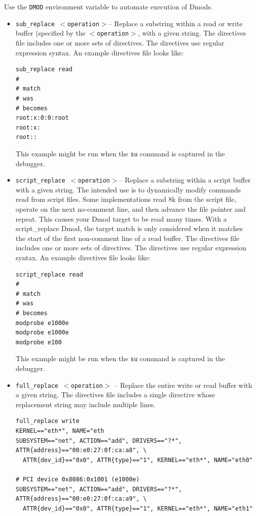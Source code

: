 \documentclass[titlepage]{article}
\begin{document}
Use the {\tt DMOD} environment variable to automate execution of Dmods.
 
\begin{itemize}
\item {\tt sub\_replace $<$operation$>$}-- Replace a substring within a read or write buffer (specified by the
{\tt $<$operation$>$}, with a given string.
The directives file includes one or more sets of directives.
The directives use regular expression syntax.
An example directives file looks like:
\begin{verbatim}
sub_replace read
#
# match
# was
# becomes
root:x:0:0:root
root:x:
root::
\end{verbatim}
\noindent This example might be run when the {\tt su} command is captured in the debugger.

\item {\tt script\_replace $<$operation$>$}-- Replace a substring within a script buffer with a given string.
The intended use is to dynamically modify commands read from script files. Some implementations read 8k
from the script file, operate on the next no-comment line, and then advance the file pointer and repeat.  This causes your Dmod target to be read
many times.  With a script\_replace Dmod, the target match is only considered when it matches the start
of the first non-comment line of a read buffer. 
The directives file includes one or more sets of directives.
The directives use regular expression syntax.
An example directives file looks like:
\begin{verbatim}
script_replace read
#
# match
# was
# becomes
modprobe e1000e
modprobe e1000e
modprobe e100
\end{verbatim}
\noindent This example might be run when the {\tt su} command is captured in the debugger.

\item {\tt full\_replace $<$operation$>$} -- Replace the entire write or read buffer with a given string.
The directives file includes a single directive whose replacement string may include multiple lines.
\begin{verbatim}
full_replace write
KERNEL=="eth*", NAME="eth
SUBSYSTEM=="net", ACTION=="add", DRIVERS=="?*", ATTR{address}=="00:e0:27:0f:ca:a8", \
  ATTR{dev_id}=="0x0", ATTR{type}=="1", KERNEL=="eth*", NAME="eth0"

# PCI device 0x8086:0x1001 (e1000e)
SUBSYSTEM=="net", ACTION=="add", DRIVERS=="?*", ATTR{address}=="00:e0:27:0f:ca:a9", \
  ATTR{dev_id}=="0x0", ATTR{type}=="1", KERNEL=="eth*", NAME="eth1"
\end{verbatim}


\end{itemize}
\end{document}
